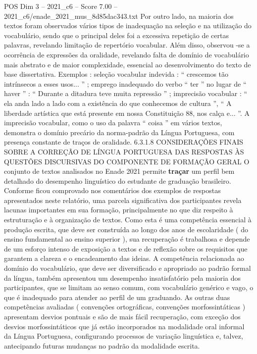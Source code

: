\begin{textsample}{POS Dim 3 – 2021\_c6 – Score 7.00 – 2021\_c6/enade\_2021\_mus\_8d85dac343.txt}
Por outro lado, na maioria dos textos foram observados vários tipos de inadequação na seleção e na utilização do vocabulário, sendo que o principal deles foi a excessiva repetição de certas palavras, revelando limitação de repertório vocabular.
Além disso, observou -se a ocorrência de expressões da oralidade, revelando falta de domínio de vocabulário mais abstrato e de maior complexidade, essencial ao desenvolvimento do texto de base dissertativa.
Exemplos : seleção vocabular indevida : “ crescemos tão intrínsecos a esses usos... ” ; emprego inadequado do verbo “ ter ” no lugar de “ haver ” : “ Durante a ditadura teve muita repressão ” ; imprecisão vocabular : “ ela anda lado a lado com a existência do que conhecemos de cultura ”, “ A liberdade artística que está presente em nossa Constituição 88, nos calça e... ”.
A imprecisão vocabular, como o uso da palavra “ coisa ” em vários textos, demonstra o domínio precário da norma-padrão da Língua Portuguesa, com presença constante de traços de oralidade. 6.3.1.8 CONSIDERAÇÕES FINAIS SOBRE A CORREÇÃO DE LÍNGUA PORTUGUESA DAS RESPOSTAS ÀS QUESTÕES DISCURSIVAS DO COMPONENTE DE FORMAÇÃO GERAL O conjunto de textos analisados no Enade 2021 permite \textbf{traçar} um perfil bem detalhado do desempenho linguístico do estudante de graduação brasileiro.
Conforme ficou comprovado nos comentários dos exemplos de respostas apresentados neste relatório, uma parcela significativa dos participantes revela lacunas importantes em sua formação, principalmente no que diz respeito à estruturação e à organização de textos.
Como esta é uma competência essencial à produção escrita, que deve ser construída ao longo dos anos de escolaridade ( do ensino fundamental ao ensino superior ), sua recuperação é trabalhosa e depende de um esforço intenso de exposição a textos e de reflexão sobre os requisitos que garantem a clareza e o encadeamento das ideias.
A competência relacionada ao domínio do vocabulário, que deve ser diversificado e apropriado ao padrão formal da língua, também apresentou um desempenho insatisfatório pela maioria dos participantes, que se limitam ao senso comum, com vocabulário genérico e vago, o que é inadequado para atender ao perfil de um graduando.
As outras duas competências avaliadas ( convenções ortográficas, convenções morfossintáticas ) apresentam desvios pontuais e são de mais fácil recuperação, com exceção dos desvios morfossintáticos que já estão incorporados na modalidade oral informal da Língua Portuguesa, configurando processos de variação linguística e, talvez, antecipando futuras mudanças no padrão da modalidade escrita.

\end{textsample}
